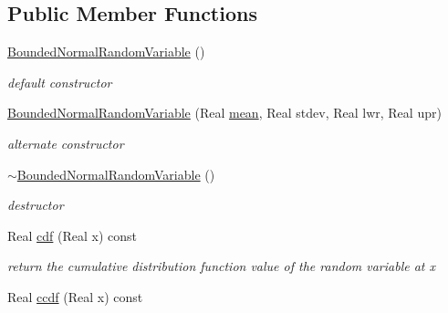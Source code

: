 \subsection*{Public Member Functions}
\begin{DoxyCompactItemize}
\item 
\hyperlink{classPecos_1_1BoundedNormalRandomVariable_a8d59131434909d023ca2821529c6c1fc}{Bounded\+Normal\+Random\+Variable} ()\label{classPecos_1_1BoundedNormalRandomVariable_a8d59131434909d023ca2821529c6c1fc}

\begin{DoxyCompactList}\small\item\em default constructor \end{DoxyCompactList}\item 
\hyperlink{classPecos_1_1BoundedNormalRandomVariable_a0e6c24b339d851e0d2fee9e94a0429bc}{Bounded\+Normal\+Random\+Variable} (Real \hyperlink{classPecos_1_1BoundedNormalRandomVariable_a962ffe5a3593be370d5c883365c060f4}{mean}, Real stdev, Real lwr, Real upr)\label{classPecos_1_1BoundedNormalRandomVariable_a0e6c24b339d851e0d2fee9e94a0429bc}

\begin{DoxyCompactList}\small\item\em alternate constructor \end{DoxyCompactList}\item 
\hyperlink{classPecos_1_1BoundedNormalRandomVariable_a7d09ec2c837d1853b97e0b40601ddf62}{$\sim$\+Bounded\+Normal\+Random\+Variable} ()\label{classPecos_1_1BoundedNormalRandomVariable_a7d09ec2c837d1853b97e0b40601ddf62}

\begin{DoxyCompactList}\small\item\em destructor \end{DoxyCompactList}\item 
Real \hyperlink{classPecos_1_1BoundedNormalRandomVariable_addd564e7f4f314e12d38df74d845f0d8}{cdf} (Real x) const \label{classPecos_1_1BoundedNormalRandomVariable_addd564e7f4f314e12d38df74d845f0d8}

\begin{DoxyCompactList}\small\item\em return the cumulative distribution function value of the random variable at x \end{DoxyCompactList}\item 
Real \hyperlink{classPecos_1_1BoundedNormalRandomVariable_a23c3b599e7e4788a9a5e9e93c3dbaf4d}{ccdf} (Real x) const \label{classPecos_1_1BoundedNormalRandomVariable_a23c3b599e7e4788a9a5e9e93c3dbaf4d}


\end{DoxyCompactItemize}
